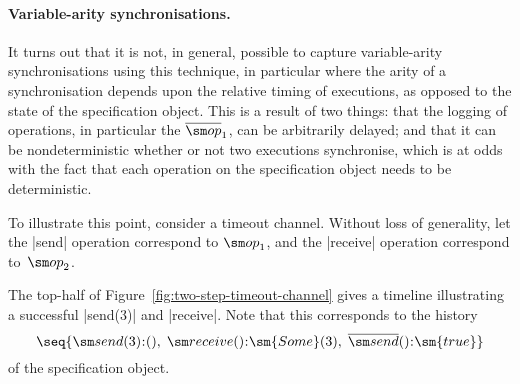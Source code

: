 

\paragraph{Variable-arity synchronisations.}

It turns out that it is not, in general, possible to capture variable-arity
synchronisations using this technique, in particular where the arity of a
synchronisation depends upon the relative timing of executions, as opposed to
the state of the specification object.  This is a result of two things: that
the logging of operations, in particular the $\overline{\op}_1$, can be
arbitrarily delayed; and that it can be nondeterministic whether or not two
executions synchronise, which is at odds with the fact that each operation on
the specification object needs to be deterministic.

To illustrate this point, consider a timeout channel.  Without loss of
generality, let the |send| operation correspond to $\op_1$, and the
|receive| operation correspond to~$\op_2$.

The top-half of Figure~\ref{fig:two-step-timeout-channel} gives a
timeline illustrating a successful |send(3)| and |receive|.  Note that this
corresponds to the history
\[
\seq{ \send(3)\::(),\; \receive()\::\sm{Some}(3),\; 
  \overline{\send}()\::\sm{true} }
\]
of the specification object.


